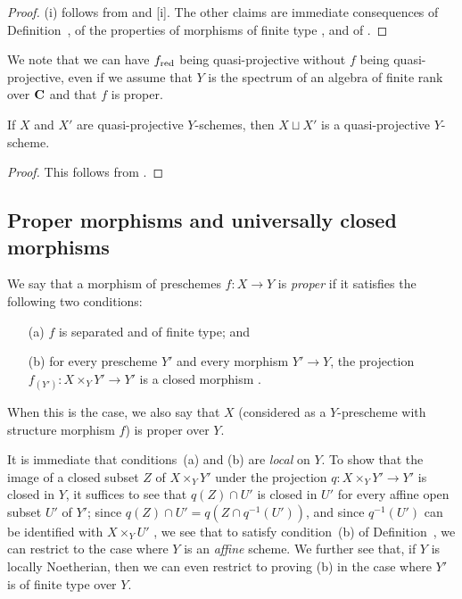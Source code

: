 \begin{proof}
\label{proof-II.5.3.4}
(i) follows from  and [i].
The other claims are immediate consequences of Definition~, of the properties of morphisms of finite type , and of .
\end{proof}

\begin{remark}[5.3.5]
\label{II.5.3.5}
We note that we can have $f_{\mathrm{red}}$ being quasi-projective without $f$ being quasi-projective, even if we assume that $Y$ is the spectrum of an algebra of finite rank over $\mathbf{C}$ and that $f$ is proper.
\end{remark}

\begin{corollary}[5.3.6]
\label{II.5.3.6}
If $X$ and $X'$ are quasi-projective $Y$-schemes, then $X\sqcup X'$ is a quasi-projective $Y$-scheme.
\end{corollary}

\begin{proof}
\label{proof-II.5.3.6}
This follows from .
\end{proof}

\subsection{Proper morphisms and universally closed morphisms}
\label{subsection:II.5.4}

\begin{definition}[5.4.1]
\label{II.5.4.1}
We say that a morphism of preschemes $f:X\to Y$ is \emph{proper} if it satisfies the following two conditions:
\begin{enumerate}
  \item[(a)] $f$ is separated and of finite type; and
  \item[(b)] for every prescheme $Y'$ and every morphism $Y'\to Y$, the projection $f_{(Y')}:X\times_Y Y'\to Y'$ is a closed morphism .
\end{enumerate}

When this is the case, we also say that $X$ (considered as a $Y$-prescheme with structure morphism $f$) is proper over $Y$.
\end{definition}

It is immediate that conditions~(a) and (b) are \emph{local} on $Y$.
To show that the image of a closed subset $Z$ of $X\times_Y Y'$ under the projection $q:X\times_Y Y'\to Y'$ is closed in $Y$, it suffices to see that $q(Z)\cap U'$ is closed in $U'$ for every affine open subset $U'$ of $Y'$;
since $q(Z)\cap U'=q(Z\cap q^{-1}(U'))$, and since $q^{-1}(U')$ can be identified with $X\times_Y U'$ , we see that to satisfy condition~(b) of Definition~, we can restrict to the case where $Y$ is an \emph{affine} scheme.
We further see  that, if $Y$ is locally Noetherian, then we can even restrict to proving (b) in the case where $Y'$ is of finite type over $Y$.

